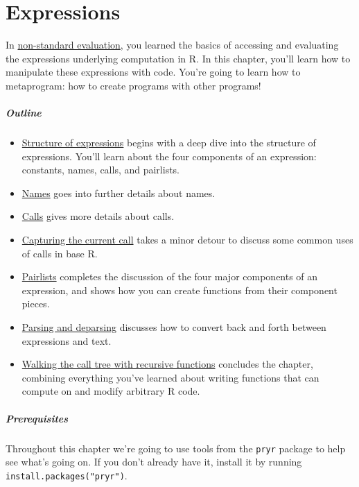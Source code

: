 \chapter{Expressions}\label{metaprogramming}

In \hyperref[nse]{non-standard evaluation}, you learned the basics of
accessing and evaluating the expressions underlying computation in R. In
this chapter, you'll learn how to manipulate these expressions with
code. You're going to learn how to metaprogram: how to create programs
with other programs! 

\paragraph{Outline}

\begin{itemize}
\item
  \hyperref[structure-of-expressions]{Structure of expressions} begins
  with a deep dive into the structure of expressions. You'll learn about
  the four components of an expression: constants, names, calls, and
  pairlists.
\item
  \hyperref[names]{Names} goes into further details about names.
\item
  \hyperref[calls]{Calls} gives more details about calls.
\item
  \hyperref[capturing-call]{Capturing the current call} takes a minor
  detour to discuss some common uses of calls in base R.
\item
  \hyperref[pairlists]{Pairlists} completes the discussion of the four
  major components of an expression, and shows how you can create
  functions from their component pieces.
\item
  \hyperref[parsing-and-deparsing]{Parsing and deparsing} discusses how
  to convert back and forth between expressions and text.
\item
  \hyperref[ast-funs]{Walking the call tree with recursive functions}
  concludes the chapter, combining everything you've learned about
  writing functions that can compute on and modify arbitrary R code.
\end{itemize}

\paragraph{Prerequisites}

Throughout this chapter we're going to use tools from the \texttt{pryr}
package to help see what's going on. If you don't already have it,
install it by running \texttt{install.packages("pryr")}.

